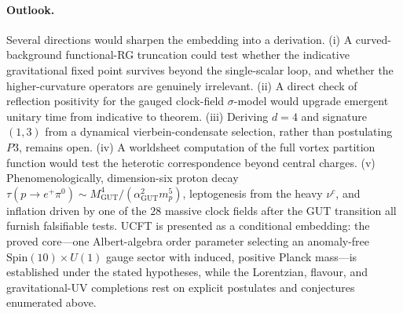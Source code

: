 \paragraph{Outlook.}
Several directions would sharpen the embedding into a derivation. (i) A
curved-background functional-RG truncation could test whether the
indicative gravitational fixed point survives beyond the single-scalar
loop, and whether the higher-curvature operators are genuinely
irrelevant. (ii) A direct check of reflection positivity for the gauged
clock-field $\sigma$-model would upgrade emergent unitary time from
indicative to theorem. (iii) Deriving $d=4$ and signature $(1,3)$ from a
dynamical vierbein-condensate selection, rather than postulating $P3$,
remains open. (iv) A worldsheet computation of the full
vortex partition function would test the heterotic correspondence beyond
central charges. (v) Phenomenologically, dimension-six proton decay
$\tau(p\to e^{+}\pi^{0})\sim M_{\mathrm{GUT}}^{4}/(\alpha_{\mathrm{GUT}}^{2}
m_{p}^{5})$, leptogenesis from the heavy $\nu^{c}$, and inflation driven
by one of the $28$ massive clock fields after the GUT transition all
furnish falsifiable tests. UCFT is presented as a conditional embedding:
the proved core---one Albert-algebra order parameter selecting an
anomaly-free $\mathrm{Spin}(10)\times U(1)$ gauge sector with induced,
positive Planck mass---is established under the stated hypotheses, while the
Lorentzian, flavour, and gravitational-UV completions rest on explicit
postulates and conjectures enumerated above.
